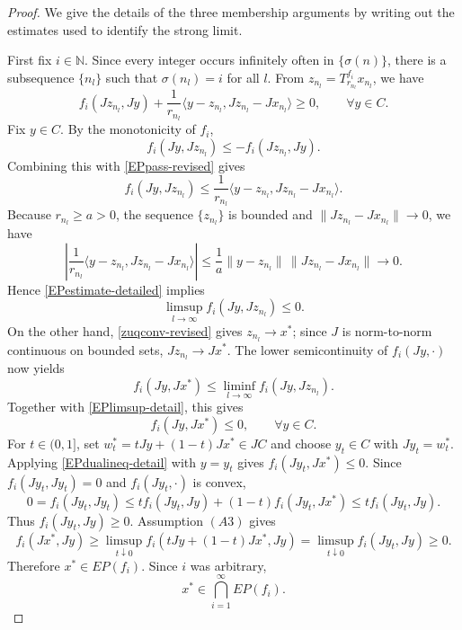 \documentclass[leqno,12pt]{amsart}
\theoremstyle{definition}
\numberwithin{equation}{section}
\begin{document}
\begin{proof}
We give the details of the three membership arguments by writing out the estimates used to identify the strong limit.

First fix $i\in\mathbb N$. Since every integer occurs infinitely often in $\{\sigma(n)\}$, there is a subsequence $\{n_l\}$ such that $\sigma(n_l)=i$ for all $l$. From
$z_{n_l}=T_{r_{n_l}}^{f_i}x_{n_l}$, we have
\begin{equation}\label{EPpass-revised}
f_i(Jz_{n_l},Jy)+\frac{1}{r_{n_l}}\langle y-z_{n_l},Jz_{n_l}-Jx_{n_l}\rangle\geq0,
\qquad \forall y\in C.
\end{equation}
Fix $y\in C$. By the monotonicity of $f_i$,
\[
f_i(Jy,Jz_{n_l})\leq -f_i(Jz_{n_l},Jy).
\]
Combining this with \eqref{EPpass-revised} gives
\begin{equation}\label{EPestimate-detailed}
f_i(Jy,Jz_{n_l})\leq
\frac{1}{r_{n_l}}\langle y-z_{n_l},Jz_{n_l}-Jx_{n_l}\rangle.
\end{equation}
Because $r_{n_l}\geq a>0$, the sequence $\{z_{n_l}\}$ is bounded and
$\|Jz_{n_l}-Jx_{n_l}\|\to0$, we have
\[
\left|\frac{1}{r_{n_l}}\langle y-z_{n_l},Jz_{n_l}-Jx_{n_l}\rangle\right|
\leq \frac{1}{a}\|y-z_{n_l}\|\,\|Jz_{n_l}-Jx_{n_l}\|\to0.
\]
Hence \eqref{EPestimate-detailed} implies
\begin{equation}\label{EPlimsup-detail}
\limsup_{l\to\infty} f_i(Jy,Jz_{n_l})\leq0.
\end{equation}
On the other hand, \eqref{zuqconv-revised} gives $z_{n_l}\to x^{*}$; since $J$ is norm-to-norm continuous on bounded sets, $Jz_{n_l}\to Jx^{*}$. The lower semicontinuity of $f_i(Jy,\cdot)$ now yields
\[
f_i(Jy,Jx^{*})\leq \liminf_{l\to\infty} f_i(Jy,Jz_{n_l}).
\]
Together with \eqref{EPlimsup-detail}, this gives
\begin{equation}\label{EPdualineq-detail}
f_i(Jy,Jx^{*})\leq0,
\qquad \forall y\in C.
\end{equation}
For $t\in(0,1]$, set $w_t^{*}=tJy+(1-t)Jx^{*}\in JC$ and choose $y_t\in C$ with $Jy_t=w_t^{*}$. Applying \eqref{EPdualineq-detail} with $y=y_t$ gives $f_i(Jy_t,Jx^{*})\leq0$. Since $f_i(Jy_t,Jy_t)=0$ and $f_i(Jy_t,\cdot)$ is convex,
\[
0=f_i(Jy_t,Jy_t)\leq t f_i(Jy_t,Jy)+(1-t)f_i(Jy_t,Jx^{*})\leq t f_i(Jy_t,Jy).
\]
Thus $f_i(Jy_t,Jy)\geq0$. Assumption $(A3)$ gives
\[
f_i(Jx^{*},Jy)
\geq \limsup_{t\downarrow0} f_i(tJy+(1-t)Jx^{*},Jy)
=\limsup_{t\downarrow0} f_i(Jy_t,Jy)\geq0.
\]
Therefore $x^{*}\in EP(f_i)$. Since $i$ was arbitrary,
\begin{equation}\label{xEP-revised}
x^{*}\in\bigcap_{i=1}^{\infty}EP(f_i).
\end{equation}


\end{proof}
\end{document}
